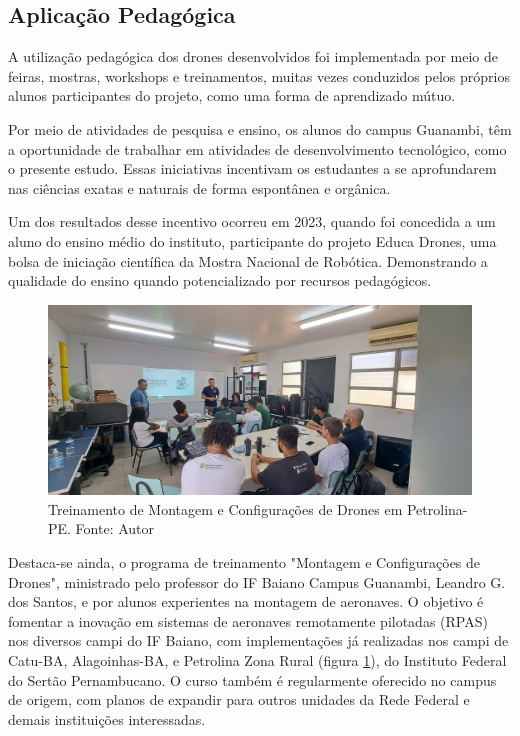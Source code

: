 \documentclass[conference]{IEEEtran}
\begin{document}
\subsection{Aplicação Pedagógica}

A utilização pedagógica dos drones desenvolvidos foi implementada por meio de feiras, mostras, workshops e treinamentos, muitas vezes conduzidos pelos próprios alunos participantes do projeto, como uma forma de aprendizado mútuo.

Por meio de atividades de pesquisa e ensino, os alunos do campus Guanambi, têm a oportunidade de trabalhar em atividades de desenvolvimento tecnológico, como o presente estudo. Essas iniciativas incentivam os estudantes a se aprofundarem nas ciências exatas e naturais de forma espontânea e orgânica.

Um dos resultados desse incentivo ocorreu em 2023, quando foi concedida a um aluno  do ensino médio do instituto, participante do projeto Educa Drones, uma bolsa de iniciação científica da Mostra Nacional de Robótica. Demonstrando a qualidade do ensino quando potencializado por recursos pedagógicos.

\begin{figure}[!htb]
    \centering
    \includegraphics[scale=0.12]{img/petrolina.jpg} 
    \caption{Treinamento de Montagem e Configurações de Drones em Petrolina-PE. Fonte: Autor}
    \label{fig:petrolina}
\end{figure}

 Destaca-se ainda, o programa de treinamento "Montagem e Configurações de Drones", ministrado pelo professor do IF Baiano Campus Guanambi, Leandro G. dos Santos, e por alunos experientes na montagem de aeronaves. O objetivo é fomentar a inovação em sistemas de aeronaves remotamente pilotadas (RPAS) nos diversos campi do IF Baiano, com implementações já realizadas nos campi de Catu-BA, Alagoinhas-BA, e Petrolina Zona Rural (figura \ref{fig:petrolina}), do Instituto Federal do Sertão Pernambucano. O curso também é regularmente oferecido no campus de origem, com planos de expandir para outros unidades da Rede Federal e demais instituições interessadas.
\end{document}
